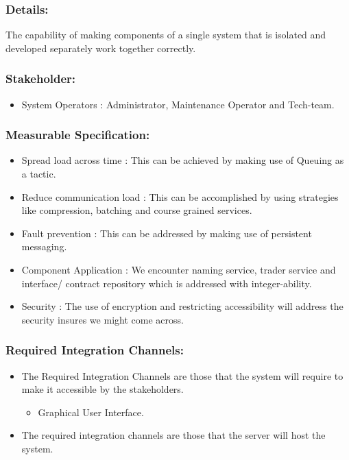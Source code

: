 \documentclass[11pt]{article}
\begin{document}
		\subsubsection{Details:}
			\textbf{}The capability of making components of a single system that is isolated and developed separately work together correctly.
		
		\subsubsection{Stakeholder:}
			\begin{itemize}
				\item System Operators : Administrator, Maintenance Operator and Tech-team.
			\end{itemize}
				
		\subsubsection{Measurable Specification:}
			
			\begin{itemize}			
			
				\item Spread load across time : This can be achieved by making use of Queuing as a tactic.
				\item Reduce communication load : This can be accomplished by using strategies like compression, batching and course grained services.
				\item  Fault prevention : This can be addressed by making use of persistent messaging.
				\item Component Application  : We encounter naming service, trader service and interface/ contract repository which is addressed with integer-ability.
				\item  Security : The use of encryption and restricting accessibility will address the security insures we might come across.
			
			\end{itemize}
			
			\subsubsection{Required Integration Channels:}
			\begin{itemize}			
			
				\item The Required Integration Channels are those that the system will require to make it accessible by the stakeholders.
				\begin{itemize}			
			
					\item Graphical User Interface.
				
				\end{itemize}	
			
				\item The required integration channels are those that the server will host the system.
			\end{itemize}	
\end{document}
